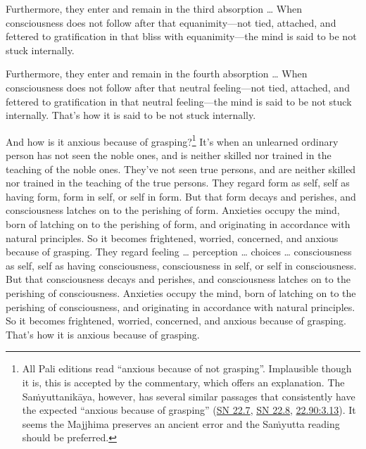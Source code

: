 \documentclass[12pt,openany]{book}%
\begin{document}
Furthermore, they enter and remain in the third absorption … When consciousness does not follow after that equanimity—not tied, attached, and fettered to gratification in that bliss with equanimity—the mind is said to be not stuck internally. 

Furthermore, they enter and remain in the fourth absorption … When consciousness does not follow after that neutral feeling—not tied, attached, and fettered to gratification in that neutral feeling—the mind is said to be not stuck internally. That’s how it is said to be not stuck internally. 

And how is it anxious because of grasping?\footnote{All Pali editions read “anxious because of not grasping”. Implausible though it is, this is accepted by the commentary, which offers an explanation. The \textsanskrit{Saṁyuttanikāya}, however, has several similar passages that consistently have the expected “anxious because of grasping” (\href{https://suttacentral.net/sn22.7/en/sujato}{SN 22.7}, \href{https://suttacentral.net/sn22.8/en/sujato}{SN 22.8}, \href{https://suttacentral.net/22.90/en/sujato\#3.13}{22.90:3.13}). It seems the Majjhima preserves an ancient error and the \textsanskrit{Saṁyutta} reading should be preferred. } It’s when an unlearned ordinary person has not seen the noble ones, and is neither skilled nor trained in the teaching of the noble ones. They’ve not seen true persons, and are neither skilled nor trained in the teaching of the true persons. They regard form as self, self as having form, form in self, or self in form. But that form decays and perishes, and consciousness latches on to the perishing of form. Anxieties occupy the mind, born of latching on to the perishing of form, and originating in accordance with natural principles. So it becomes frightened, worried, concerned, and anxious because of grasping. They regard feeling … perception … choices … consciousness as self, self as having consciousness, consciousness in self, or self in consciousness. But that consciousness decays and perishes, and consciousness latches on to the perishing of consciousness. Anxieties occupy the mind, born of latching on to the perishing of consciousness, and originating in accordance with natural principles. So it becomes frightened, worried, concerned, and anxious because of grasping. That’s how it is anxious because of grasping. 
\end{document}
